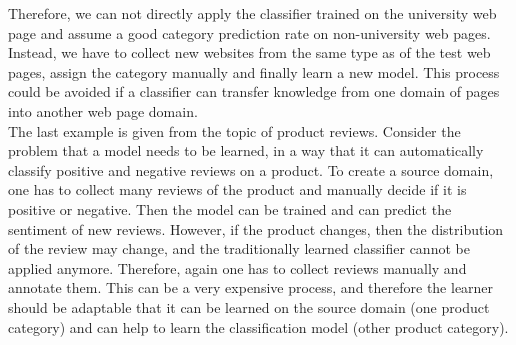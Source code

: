 Therefore, we can not directly apply the classifier trained on the university web page and assume a good category prediction rate on non-university web pages.
Instead, we have to collect new websites from the same type as of the test web pages, assign the category manually and finally learn a new model.
This process could be avoided if a classifier can transfer knowledge from one domain of pages into another web page domain.\cite{Pan.2010}\\
The last example is given from the topic of product reviews.
Consider the problem that a model needs to be learned, in a way that it can automatically classify positive and negative reviews on a product.
To create a source domain, one has to collect many reviews of the product and manually decide if it is positive or negative.
Then the model can be trained and can predict the sentiment of new reviews.
However, if the product changes, then the distribution of the review may change, and the traditionally learned classifier cannot be applied anymore.
Therefore, again one has to collect reviews manually and annotate them.
This can be a very expensive process, and therefore the learner should be adaptable that it can be learned on the source domain (one product category) and can help to learn the classification model (other product category).\cite{Pan.2010}

